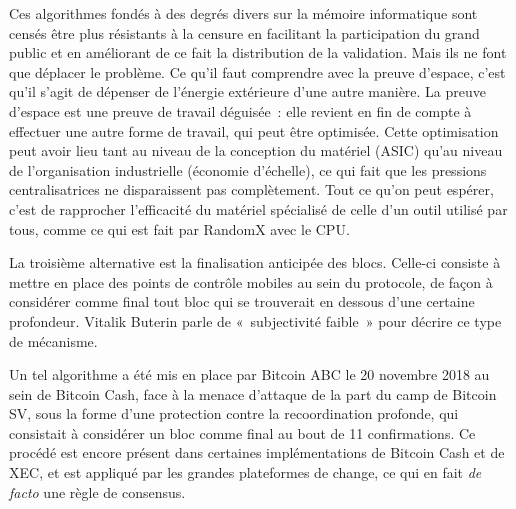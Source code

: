 Ces algorithmes fondés à des degrés divers sur la mémoire informatique sont censés être plus résistants à la censure en facilitant la participation du grand public et en améliorant de ce fait la distribution de la validation. Mais ils ne font que déplacer le problème. Ce qu'il faut comprendre avec la preuve d'espace, c'est qu'il s'agit de dépenser de l'énergie extérieure d'une autre manière. La preuve d'espace est une preuve de travail déguisée~: elle revient en fin de compte à effectuer une autre forme de travail, qui peut être optimisée. Cette optimisation peut avoir lieu tant au niveau de la conception du matériel (ASIC) qu'au niveau de l'organisation industrielle (économie d'échelle), ce qui fait que les pressions centralisatrices ne disparaissent pas complètement. Tout ce qu'on peut espérer, c'est de rapprocher l'efficacité du matériel spécialisé de celle d'un outil utilisé par tous, comme ce qui est fait par RandomX avec le CPU.


La troisième alternative est la finalisation anticipée des blocs. Celle-ci consiste à mettre en place des points de contrôle mobiles au sein du protocole, de façon à considérer comme final tout bloc qui se trouverait en dessous d'une certaine profondeur. Vitalik Buterin parle de «~subjectivité faible~» pour décrire ce type de mécanisme.

Un tel algorithme a été mis en place par Bitcoin ABC le 20 novembre 2018 au sein de Bitcoin Cash, face à la menace d'attaque de la part du camp de Bitcoin SV, sous la forme d'une protection contre la recoordination profonde, qui consistait à considérer un bloc comme final au bout de 11 confirmations. Ce procédé est encore présent dans certaines implémentations de Bitcoin Cash et de XEC, et est appliqué par les grandes plateformes de change, ce qui en fait \emph{de facto} une règle de consensus. %

